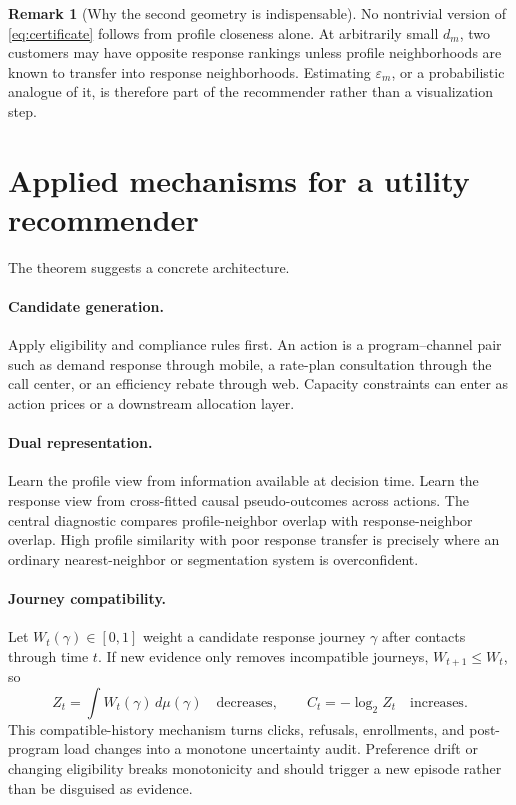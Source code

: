 \documentclass[11pt]{article}
\theoremstyle{noteplain}
\theoremstyle{definition}
\newtheorem{remark}[theorem]{Remark}
\begin{document}
\begin{remark}[Why the second geometry is indispensable]
No nontrivial version of \eqref{eq:certificate} follows from profile closeness alone.  At arbitrarily small $d_m$, two customers may have opposite response rankings unless profile neighborhoods are known to transfer into response neighborhoods.  Estimating $\varepsilon_m$, or a probabilistic analogue of it, is therefore part of the recommender rather than a visualization step.
\end{remark}

\section{Applied mechanisms for a utility recommender}

The theorem suggests a concrete architecture.

\paragraph{Candidate generation.}
Apply eligibility and compliance rules first.  An action is a program--channel pair such as demand response through mobile, a rate-plan consultation through the call center, or an efficiency rebate through web.  Capacity constraints can enter as action prices or a downstream allocation layer.

\paragraph{Dual representation.}
Learn the profile view from information available at decision time.  Learn the response view from cross-fitted causal pseudo-outcomes across actions.  The central diagnostic compares profile-neighbor overlap with response-neighbor overlap.  High profile similarity with poor response transfer is precisely where an ordinary nearest-neighbor or segmentation system is overconfident.

\paragraph{Journey compatibility.}
Let $W_t(\gamma)\in[0,1]$ weight a candidate response journey $\gamma$ after contacts through time $t$.  If new evidence only removes incompatible journeys, $W_{t+1}\leq W_t$, so
\[
 Z_t=\int W_t(\gamma)\,d\mu(\gamma)\quad\text{decreases},\qquad
 C_t=-\log_2 Z_t\quad\text{increases}.
\]
This compatible-history mechanism turns clicks, refusals, enrollments, and post-program load changes into a monotone uncertainty audit.  Preference drift or changing eligibility breaks monotonicity and should trigger a new episode rather than be disguised as evidence.
\end{document}

